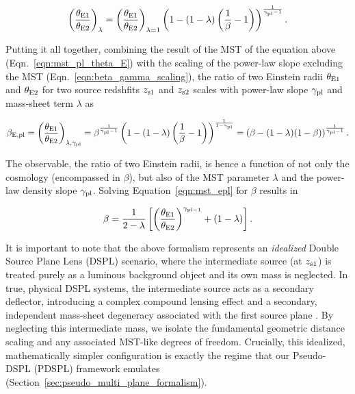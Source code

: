 \documentclass[a4paper,11pt]{article}
\begin{document}
\begin{equation}\label{eqn:mst_pl_theta_E}
    \left( \frac{\theta_{\rm E1}}{\theta_{\rm E2}} \right)_{\lambda} = \left(\frac{\theta_{\rm E1}}{\theta_{\rm E2}} \right)_{\lambda = 1} \left(1 - (1 - \lambda) \left(\frac{1}{\beta} -1\right) \right)^{\frac{1}{\gamma_{\rm pl} - 1}}.
\end{equation}

Putting it all together, combining the result of the MST of the equation above (Eqn.~\ref{eqn:mst_pl_theta_E}) with the scaling of the power-law slope excluding the MST (Eqn.~\ref{eqn:beta_gamma_scaling}), the ratio of two Einstein radii $\theta_{\rm E1}$ and $\theta_{\rm E2}$ for two source redshfits $z_{\rm s1}$ and $z_{\rm s2}$ scales with power-law slope $\gamma_{\rm pl}$ and mass-sheet term $\lambda$ as

\begin{equation}\label{eqn:mst_epl}
    \beta_{\rm E,pl} = \left( \frac{\theta_{\rm E1}}{\theta_{\rm E2}} \right)_{\lambda, \gamma_{\rm pl}} = \beta^{\frac{1}{\gamma_{\rm pl} - 1}}\left(1 - (1 - \lambda) \left(\frac{1}{\beta} -1\right) \right)^{\frac{1}{1 -\gamma_{\rm pl}}}
    = \left(\beta - (1-\lambda)(1-\beta) \right)^{\frac{1}{\gamma_{\rm pl} - 1}}.
\end{equation}

The observable, the ratio of two Einstein radii, is hence a function of not only the cosmology (encompassed in $\beta$), but also of the MST parameter $\lambda$ and the power-law density slope $\gamma_{\rm pl}$. 
%
Solving Equation~\ref{eqn:mst_epl} for $\beta$ results in

\begin{equation}\label{eqn:beta_mst_pl}
    \beta = \frac{1}{2 - \lambda} \left[ \left( \frac{\theta_{\rm E1}}{\theta_{\rm E2}} \right)^{\gamma_{\rm pl -1}} + (1 - \lambda) \right].
\end{equation}

It is important to note that the above formalism represents an \emph{idealized} Double Source Plane Lens (DSPL) scenario, where the intermediate source (at $z_{\rm s1}$) is treated purely as a luminous background object and its own mass is neglected. In true, physical DSPL systems, the intermediate source acts as a secondary deflector, introducing a complex compound lensing effect and a secondary, independent mass-sheet degeneracy associated with the first source plane \cite{Johnson:2025}. By neglecting this intermediate mass, we isolate the fundamental geometric distance scaling and any associated MST-like degrees of freedom. Crucially, this idealized, mathematically simpler configuration is exactly the regime that our Pseudo-DSPL (PDSPL) framework emulates (Section~\ref{sec:pseudo_multi_plane_formalism}).
\end{document}
